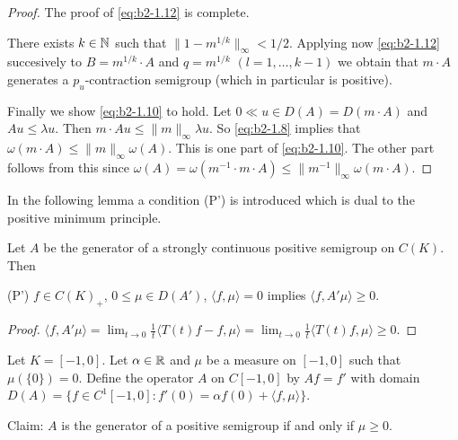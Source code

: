 \begin{proof}
The proof of \eqref{eq:b2-1.12} is complete.

There exists $k \in \mathbb{N}$ such that $\|1 - m^{1/k}\|_{\infty} < 1/2$.
Applying now \eqref{eq:b2-1.12} 
succesively to $B = m^{1/k} \cdot A$ and $q = m^{1/k}$ $(l = 1, \ldots, k-1)$ we obtain that $m \cdot A$ generates a $p_{u}$-contraction semigroup (which in particular is positive).

Finally we show \eqref{eq:b2-1.10} 
to hold.
Let $0 \ll u \in D(A) = D(m \cdot A)$ and $Au \leq \lambda u$.
Then $m \cdot Au \leq \|m\|_{\infty}\lambda u$.
So \eqref{eq:b2-1.8} 
implies that $\omega(m \cdot A) \leq \|m\|_{\infty}\omega(A)$.
This is one part of \eqref{eq:b2-1.10}. 
The other part follows from this since $\omega(A) = \omega(m^{-1} \cdot m \cdot A) \leq \|m^{-1}\|_{\infty} \omega(m \cdot A)$.
\end{proof}

In the following lemma a condition (P') is introduced which is dual to the positive minimum principle.

\begin{lemma}\label{lem:b2-1.21}
Let $A$ be the generator of a strongly continuous positive semigroup on $C(K)$.
Then 

(P') $f \in C(K)_{+}$, $0 \leq \mu \in D(A')$, $\langle f,\mu \rangle = 0$ implies $\langle f,A'\mu \rangle \geq 0$.
\end{lemma}

\begin{proof}
$\langle f,A'\mu \rangle = \lim_{t \to 0} \frac{1}{t} \langle T(t)f - f, \mu \rangle = \lim_{t \to 0} \frac{1}{t} \langle T(t)f, \mu \rangle \geq 0$.
\end{proof}

\begin{example}\label{ex:b2-1.22}
Let $K = [-1,0]$.
Let $\alpha \in \mathbb{R}$ and $\mu$ be a measure on $[-1,0]$ such that $\mu(\{0\}) = 0$.
Define the operator $A$ on $C[-1,0]$ by $Af = f'$ with domain $D(A) = \{f \in C^{1}[-1,0] \colon f'(0) = \alpha f(0) + \langle f,\mu \rangle\}$.

Claim: $A$ is the generator of a positive semigroup if and only if $\mu \geq 0$.
\end{example}

